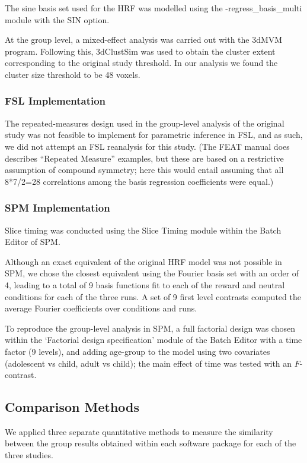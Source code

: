 The sine basis set used for the HRF was modelled using the -regress\_basis\_multi module with the SIN option.

At the group level, a mixed-effect analysis was carried out with the 3dMVM program. Following this, 3dClustSim was used to obtain the cluster extent corresponding to the original study threshold. In our analysis we found the cluster size threshold to be 48 voxels.

\subsubsection{FSL Implementation}
The repeated-measures design used in the group-level analysis of the original study was not feasible to implement for parametric inference in FSL, and as such, we did not attempt an FSL reanalysis for this study. (The FEAT manual does describes ``Repeated Measure'' examples, but these are based on a restrictive assumption of compound symmetry; here this would entail assuming that all 8*7/2=28 correlations among the basis regression coefficients were equal.)
\subsubsection{SPM Implementation}
Slice timing was conducted using the Slice Timing module within the Batch Editor of SPM.

Although an exact equivalent of the original HRF model was not possible in SPM, we chose the closest equivalent using the Fourier basis set with an order of 4, leading to a total of 9 basis functions fit to each of the reward and neutral conditions for each of the three runs.  A set of 9 first level contrasts computed the average Fourier coefficients over conditions and runs.

To reproduce the group-level analysis in SPM, a full factorial design was chosen within the `Factorial design specification' module of the Batch Editor with a time factor (9 levels), and adding age-group to the model using two covariates (adolescent vs child, adult vs child); the main effect of time was tested with an $F$-contrast.

\subsection{Comparison Methods}

We applied three separate quantitative methods to measure the similarity between the group results obtained within each software package for each of the three studies. 

